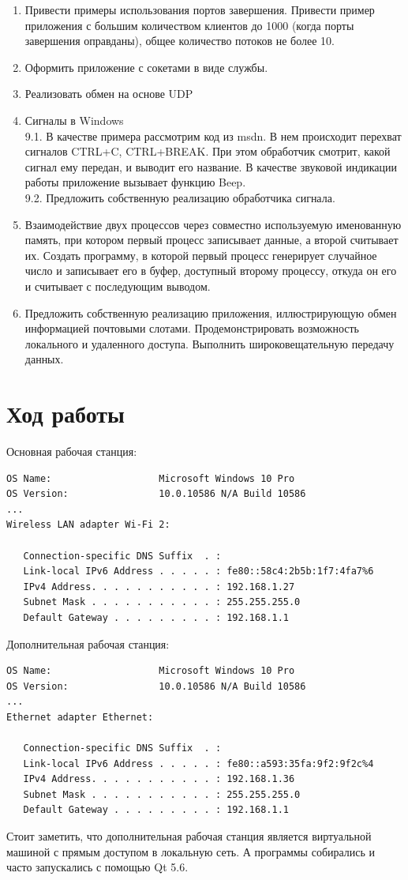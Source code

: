 \documentclass[a4paper]{article}
\begin{document}
\begin{enumerate}
\item  Привести примеры использования портов завершения. Привести пример приложения с большим количеством клиентов до 1000 (когда порты завершения оправданы), общее количество потоков не более 10.
\item  Оформить приложение с сокетами в виде службы.
\item  Реализовать обмен на основе UDP
\item  Сигналы в Windows\\
9.1. В качестве примера рассмотрим код из msdn. В нем происходит перехват сигналов CTRL+C, CTRL+BREAK. При этом обработчик смотрит, какой сигнал ему передан, и выводит его название. В качестве звуковой индикации работы приложение вызывает функцию Beep.\\
9.2. Предложить собственную реализацию обработчика сигнала.
\item Взаимодействие двух процессов через совместно используемую именованную память, при котором первый процесс записывает данные, а второй считывает их. Создать программу, в которой первый процесс генерирует случайное число и записывает его в буфер, доступный второму процессу, откуда он его и считывает с последующим выводом.
\item  Предложить собственную реализацию приложения, иллюстрирующую обмен информацией почтовыми слотами. Продемонстрировать возможность локального и удаленного доступа. Выполнить широковещательную передачу данных.
\end{enumerate}

\section{Ход работы}
Основная рабочая станция:\begin{lstlisting}
OS Name:                   Microsoft Windows 10 Pro
OS Version:                10.0.10586 N/A Build 10586
...
Wireless LAN adapter Wi-Fi 2:

   Connection-specific DNS Suffix  . :
   Link-local IPv6 Address . . . . . : fe80::58c4:2b5b:1f7:4fa7%6
   IPv4 Address. . . . . . . . . . . : 192.168.1.27
   Subnet Mask . . . . . . . . . . . : 255.255.255.0
   Default Gateway . . . . . . . . . : 192.168.1.1
	\end{lstlisting}
	
Дополнительная рабочая станция:\begin{lstlisting}
OS Name:                   Microsoft Windows 10 Pro
OS Version:                10.0.10586 N/A Build 10586
...
Ethernet adapter Ethernet:

   Connection-specific DNS Suffix  . :
   Link-local IPv6 Address . . . . . : fe80::a593:35fa:9f2:9f2c%4
   IPv4 Address. . . . . . . . . . . : 192.168.1.36
   Subnet Mask . . . . . . . . . . . : 255.255.255.0
   Default Gateway . . . . . . . . . : 192.168.1.1
	\end{lstlisting}
Стоит заметить, что дополнительная рабочая станция является виртуальной машиной с прямым доступом в локальную сеть. А программы собирались и часто запускались с помощью Qt 5.6.
\end{document}

